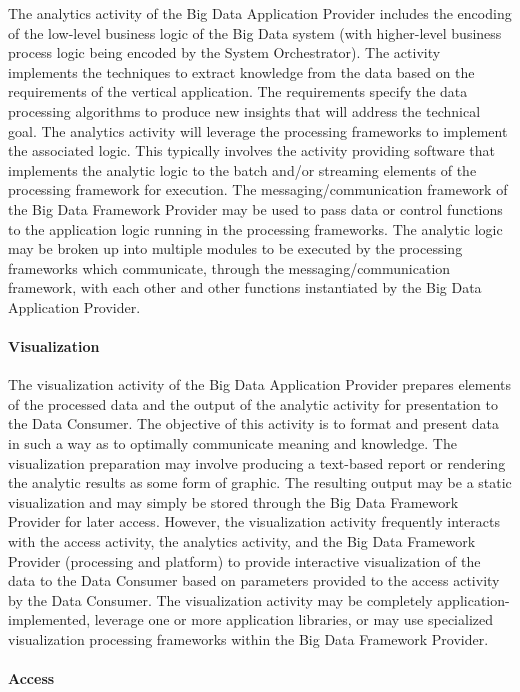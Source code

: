 \documentclass[10pt]{article}
\begin{document}
The analytics activity of the Big Data Application Provider includes
the encoding of the low-level business logic of the Big Data system
(with higher-level business process logic being encoded by the System
Orchestrator). The activity implements the techniques to extract
knowledge from the data based on the requirements of the vertical
application. The requirements specify the data processing algorithms
to produce new insights that will address the
technical goal. The analytics activity will leverage the processing
frameworks to implement the associated logic. This typically involves
the activity providing software that implements the analytic logic to
the batch and/or streaming elements of the processing framework for
execution. The messaging/communication framework of the Big Data
Framework Provider may be used to pass data or control functions to
the application logic running in the processing frameworks. The
analytic logic may be broken up into multiple modules to be executed
by the processing frameworks which communicate, through the
messaging/communication framework, with each other and other functions
instantiated by the Big Data Application Provider.

\paragraph{Visualization}

The visualization activity of the Big Data Application Provider
prepares elements of the processed data and the output of the analytic
activity for presentation to the Data Consumer. The objective of this
activity is to format and present data in such a way as to optimally
communicate meaning and knowledge. The visualization preparation may
involve producing a text-based report or rendering the analytic
results as some form of graphic. The resulting output may be a static
visualization and may simply be stored through the Big Data Framework
Provider for later access. However, the visualization activity
frequently interacts with the access activity, the analytics activity,
and the Big Data Framework Provider (processing and platform) to
provide interactive visualization of the data to the Data Consumer
based on parameters provided to the access activity by the Data
Consumer. The visualization activity may be completely
application-implemented, leverage one or more application libraries,
or may use specialized visualization processing frameworks within the
Big Data Framework Provider.

\paragraph{Access}
\end{document}
